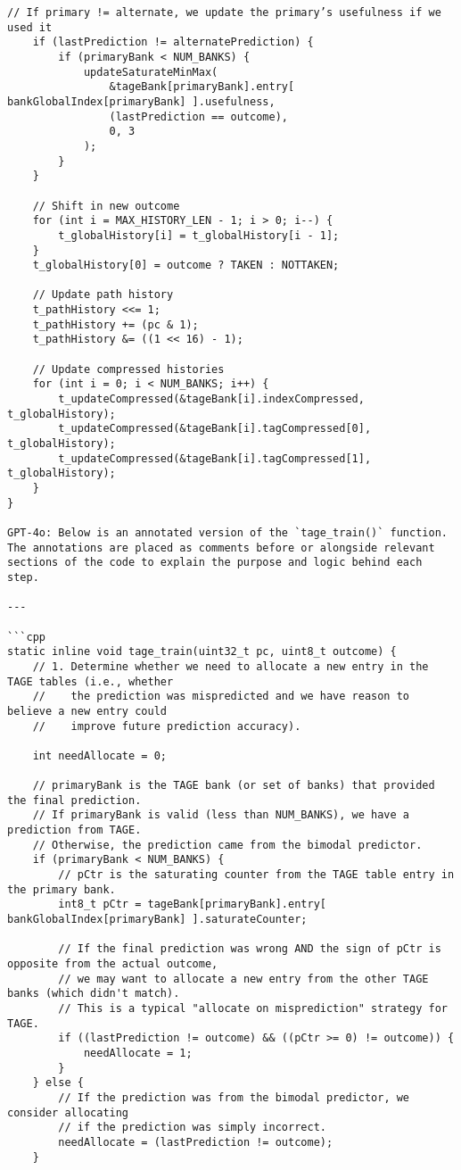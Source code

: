 \documentclass[sigconf, screen]{acmart}
\begin{document}
\begin{Verbatim}[fontsize=\tiny, breaklines=true]
    // If primary != alternate, we update the primary’s usefulness if we used it
    if (lastPrediction != alternatePrediction) {
        if (primaryBank < NUM_BANKS) {
            updateSaturateMinMax(
                &tageBank[primaryBank].entry[ bankGlobalIndex[primaryBank] ].usefulness,
                (lastPrediction == outcome),
                0, 3
            );
        }
    }

    // Shift in new outcome
    for (int i = MAX_HISTORY_LEN - 1; i > 0; i--) {
        t_globalHistory[i] = t_globalHistory[i - 1];
    }
    t_globalHistory[0] = outcome ? TAKEN : NOTTAKEN;

    // Update path history
    t_pathHistory <<= 1;
    t_pathHistory += (pc & 1);
    t_pathHistory &= ((1 << 16) - 1);

    // Update compressed histories
    for (int i = 0; i < NUM_BANKS; i++) {
        t_updateCompressed(&tageBank[i].indexCompressed, t_globalHistory);
        t_updateCompressed(&tageBank[i].tagCompressed[0], t_globalHistory);
        t_updateCompressed(&tageBank[i].tagCompressed[1], t_globalHistory);
    }
}

GPT-4o: Below is an annotated version of the `tage_train()` function. The annotations are placed as comments before or alongside relevant sections of the code to explain the purpose and logic behind each step.

---

```cpp
static inline void tage_train(uint32_t pc, uint8_t outcome) {
    // 1. Determine whether we need to allocate a new entry in the TAGE tables (i.e., whether
    //    the prediction was mispredicted and we have reason to believe a new entry could
    //    improve future prediction accuracy).

    int needAllocate = 0;

    // primaryBank is the TAGE bank (or set of banks) that provided the final prediction.
    // If primaryBank is valid (less than NUM_BANKS), we have a prediction from TAGE.
    // Otherwise, the prediction came from the bimodal predictor.
    if (primaryBank < NUM_BANKS) {
        // pCtr is the saturating counter from the TAGE table entry in the primary bank.
        int8_t pCtr = tageBank[primaryBank].entry[ bankGlobalIndex[primaryBank] ].saturateCounter;

        // If the final prediction was wrong AND the sign of pCtr is opposite from the actual outcome,
        // we may want to allocate a new entry from the other TAGE banks (which didn't match).
        // This is a typical "allocate on misprediction" strategy for TAGE.
        if ((lastPrediction != outcome) && ((pCtr >= 0) != outcome)) {
            needAllocate = 1;
        }
    } else {
        // If the prediction was from the bimodal predictor, we consider allocating
        // if the prediction was simply incorrect.
        needAllocate = (lastPrediction != outcome);
    }


\end{Verbatim}
\end{document}

